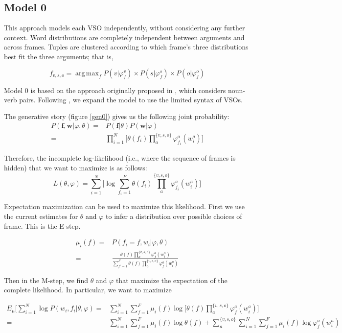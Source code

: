\documentclass{article} %
\renewcommand\phi\varphi
\DeclareMathOperator*{\argmax}{arg\,max}
\begin{document}
\subsection{Model 0}

This approach models each VSO independently, without considering any further context.
Word distributions are completely independent between arguments and across frames.
Tuples are clustered according to which frame's three distributions best fit the 
three arguments; that is,

\[
f_{v,s,o} = \argmax_f P(v|\phi_f^v) \times P(s|\phi_f^s) \times P(o|\phi_f^o)
\]

Model 0 is based on the approach originally proposed in \citet{rooth1999}, which 
considers noun-verb pairs. Following \citet{oconnor2013}, we expand the model
to use the limited syntax of VSOs.

The generative story (figure \ref{gen0}) gives us the following joint probability:
\begin{align*}
P(\mathbf{f},\mathbf{w}|\phi,\theta) 
  =& P(\mathbf{f}|\theta)P(\mathbf{w}|\phi)\\
  =& \prod_{i=1}^{N}\big[\theta(f_i) \prod_a^{\{v,s,o\}}\phi_{f_i}^a(w_i^a)\big]
\end{align*}

Therefore, the incomplete log-likelihood (i.e., where the sequence of frames
is hidden) that we want to maximize is as follows:
\[
L(\theta,\phi) = \sum_{i=1}^N\big[\log \sum_{f_i=1}^F\theta(f_i)\prod_{a}^{\{v,s,o\}}\phi_{f_i}^a(w^a_i)\big]
\]

Expectation maximization can be used to maximize this likelihood.
First we use the current estimates for $\theta$ and $\phi$ to infer a 
distribution over possible choices of frame. This is the E-step. 

\begin{align}
\mu_i(f) =& P(f_i=f, w_i|\phi,\theta)\nonumber\\
=& \frac{\theta(f)\prod_a^{\{v,s,o\}}\phi_f^a(w^a_i)}
                {\sum_{f'=1}^F\theta(f)\prod_a^{\{v,s,o\}}\phi_f^a(w^a_i)}\label{E}
\end{align}

Then in the M-step, we find $\theta$ and $\phi$ that maximize the expectation of
the complete likelihood. In particular, we want to maximize

\begin{align*}
E_\mu\big[\sum_{i=1}^N\log P(w_i,f_i|\theta,\phi)
=& \sum_{i=1}^N\sum_{f=1}^F\mu_i(f)\log\Big[\theta(f)\prod_a^{\{v,s,o\}}\phi_f^a(w_i^a)\Big]\\
=& \sum_{i=1}^N\sum_{f=1}^F\mu_i(f)\log\theta(f)
+ \sum_a^{\{v,s,o\}} \sum_{i=1}^N\sum_{f=1}^F\mu_i(f)\log \phi_f^a(w_i^a)
\end{align*}
\end{document}
